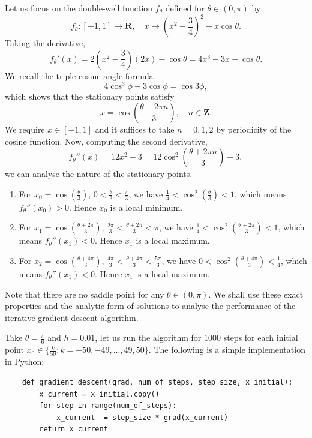 \documentclass{article}
\begin{document}
Let us focus on the double-well function \(f_\theta\) defined for \(\theta \in (0, \pi)\) by
\[ f_\theta: [-1, 1] \to \mathbf{R}, \quad x \mapsto \left(x^2 - \frac{3}{4}\right)^2 - x\cos\theta. \]
Taking the derivative,
\[ f_\theta'(x) = 2\left(x^2 - \frac{3}{4}\right)(2x) - \cos\theta = 4x^3 - 3x - \cos\theta. \]
We recall the triple cosine angle formula
\[ 4\cos^3\phi - 3\cos\phi = \cos3\phi, \]
which shows that the stationary points satisfy
\[ x = \cos\left(\frac{\theta + 2\pi n}{3}\right), \quad n \in \mathbf{Z}. \]
We require \(x \in [-1, 1]\) and it suffices to take \(n = 0,1,2\) by periodicity of the cosine function. Now, computing the second derivative,
\[ f_\theta''(x) = 12x^2 - 3 = 12\cos^2\left(\frac{\theta + 2\pi n}{3}\right) - 3, \]
we can analyse the nature of the stationary points. 
\begin{enumerate}
    \item For \(x_0 = \cos\left(\frac{\theta}{3}\right)\), \(0 < \frac{\theta}{3} < \frac{\pi}{3}\), we have \(\frac{1}{4} < \cos^2\left(\frac{\theta}{3}\right) < 1\), which means \(f_\theta''(x_0) > 0\). Hence \(x_0\) is a local minimum.
    \item For \(x_1 = \cos\left(\frac{\theta + 2\pi}{3}\right)\), \(\frac{2\pi}{3} < \frac{\theta+2\pi}{3} < \pi\), we have \(\frac{1}{4} < \cos^2\left(\frac{\theta+2\pi}{3}\right) < 1\), which means \(f_\theta''(x_1) < 0\). Hence \(x_1\) is a local maximum.
    \item For \(x_2 = \cos\left(\frac{\theta + 4\pi}{3}\right)\), \(\frac{4\pi}{3} < \frac{\theta+4\pi}{3} < \frac{5\pi}{3}\), we have \(0 < \cos^2\left(\frac{\theta+4\pi}{3}\right) < \frac{1}{4}\), which means \(f_\theta''(x_1) < 0\). Hence \(x_1\) is a local maximum.
\end{enumerate}
Note that there are no saddle point for any \(\theta \in (0, \pi)\). We shall use these exact properties and the analytic form of solutions to analyse the performance of the iterative gradient descent algorithm. 

Take \(\theta = \frac{\pi}{6}\) and \(h = 0.01\), let us run the algorithm for \(1000\) steps for each initial point \(x_0 \in \{\frac{k}{50} : k = -50, -49, \dots, 49, 50\}\). The following is a simple implementation in Python:

\begin{verbatim}
    def gradient_descent(grad, num_of_steps, step_size, x_initial):
        x_current = x_initial.copy()
        for step in range(num_of_steps):
            x_current -= step_size * grad(x_current)
        return x_current
\end{verbatim}
\end{document}
